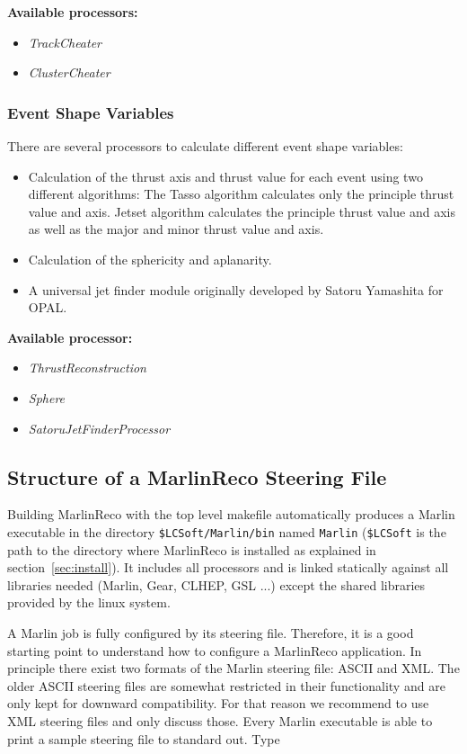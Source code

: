{\bf Available processors:} 
\begin{itemize}
\item {\em TrackCheater}
\item {\em ClusterCheater}
\end{itemize}

\subsubsection{Event Shape Variables}

There are several processors to calculate different event shape variables:

\begin{itemize}
\item Calculation of the thrust axis and thrust value for each event using two
      different algorithms:
      The Tasso algorithm calculates only the principle thrust value and axis.
      Jetset algorithm calculates the principle thrust value and axis
      as well as the major and minor thrust value and axis.   
\item Calculation of the sphericity and aplanarity. 
\item A universal jet finder module originally developed by Satoru Yamashita for
   OPAL.
\end{itemize}

{\bf Available processor:} 
\begin{itemize}
\item {\em ThrustReconstruction}
\item {\em Sphere}
\item {\em SatoruJetFinderProcessor}
\end{itemize}

\subsection{Structure of a MarlinReco Steering File}

Building MarlinReco with the top level makefile automatically produces a
Marlin executable in the directory {\tt \$LCSoft/Marlin/bin} named 
{\tt Marlin}
({\tt \$LCSoft} is the path to the directory where MarlinReco is installed as
explained in section~\ref{sec:install}).
It includes all processors and is linked statically against all 
libraries needed (Marlin, Gear, CLHEP, GSL ...) except the shared libraries
provided by the linux system. 

A Marlin job is fully configured by its steering file. 
Therefore, it is a good starting point to understand how to configure a 
MarlinReco application. 
In principle there exist two formats of the Marlin steering file: 
ASCII and XML. The older ASCII steering files are somewhat restricted in their 
functionality and are only kept for downward compatibility. For that reason 
we recommend to use XML steering files and only discuss those. 
Every Marlin executable is
able to print a sample steering file to standard out. Type

